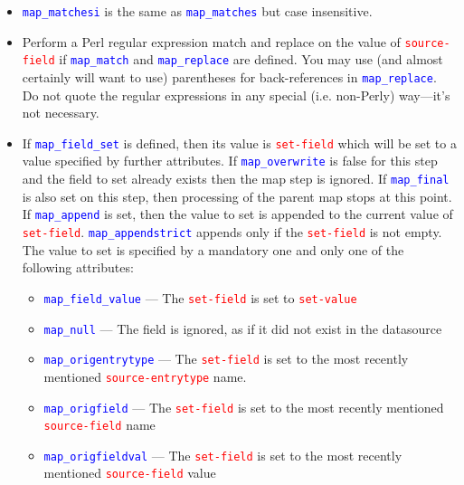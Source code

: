 \documentclass{ltxdockit}
\begin{document}
\begin{itemize}
  \textcolor{blue}{\texttt{map\_replace}}. The lists must have the same
  number of elements or the step will be skipped.
\item \textcolor{blue}{\texttt{map\_matchesi}} is the same as
  \textcolor{blue}{\texttt{map\_matches}} but case insensitive.
\item Perform a Perl regular expression match and replace on the value of
  \textcolor{red}{\texttt{source-field}} if
  \textcolor{blue}{\texttt{map\_match}} and
  \textcolor{blue}{\texttt{map\_replace}} are defined. You may use (and almost certainly
  will want to use) parentheses for back-references in \textcolor{blue}{\texttt{map\_replace}}.
  Do not quote the regular expressions in any special (i.e. non-Perly) way---it's not
  necessary.
\item If \textcolor{blue}{\texttt{map\_field\_set}} is defined, then its
  value is \textcolor{red}{\texttt{set-field}} which will be set to a value
  specified by further attributes. If
  \textcolor{blue}{\texttt{map\_overwrite}} is false for this step and the
  field to set already exists then the map step is ignored. If
  \textcolor{blue}{\texttt{map\_final}} is also set on this step, then
  processing of the parent map stops at this point. If
  \textcolor{blue}{\texttt{map\_append}} is set, then the value to set is
  appended to the current value of \textcolor{red}{\texttt{set-field}}.
  \textcolor{blue}{\texttt{map\_appendstrict}} appends only if the
  \textcolor{red}{\texttt{set-field}} is not empty. The value to set is
  specified by a mandatory one and only one of the following attributes:
  \begin{itemize}
    \item \textcolor{blue}{\texttt{map\_field\_value}} --- The
      \textcolor{red}{\texttt{set-field}} is set to
      \textcolor{red}{\texttt{set-value}}
    \item \textcolor{blue}{\texttt{map\_null}} --- The field is ignored, as
      if it did not exist in the datasource
    \item \textcolor{blue}{\texttt{map\_origentrytype}} --- The
      \textcolor{red}{\texttt{set-field}} is set to the
      most recently mentioned \textcolor{red}{\texttt{source-entrytype}} name.
    \item \textcolor{blue}{\texttt{map\_origfield}} --- The
      \textcolor{red}{\texttt{set-field}} is set to the most recently
      mentioned \textcolor{red}{\texttt{source-field}} name
    \item \textcolor{blue}{\texttt{map\_origfieldval}} --- The
      \textcolor{red}{\texttt{set-field}} is set to the most recently
      mentioned \textcolor{red}{\texttt{source-field}} value
  \end{itemize}
\end{itemize}
\end{document}
